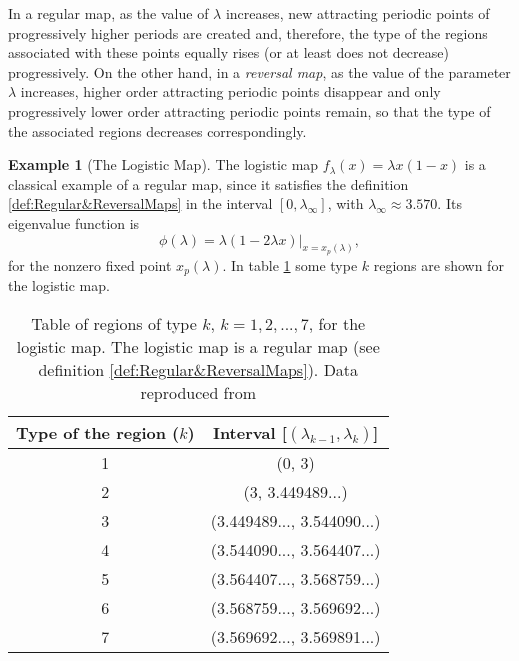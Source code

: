 \documentclass[10pt,twoside,titlepage]{book}
\numberwithin{equation}{chapter}
\numberwithin{figure}{chapter}
\numberwithin{table}{chapter}
\theoremstyle{plain}%
\theoremstyle{definition}
\newtheorem{example}{Example}[chapter]
\theoremstyle{remark}
\begin{document}
In a regular map, as the value of $\lambda$ increases, new attracting periodic points of progressively higher periods are created and, therefore, the type of the regions associated with these points equally rises (or at least does not decrease) progressively. On the other hand, in a \emph{reversal map}, as the value of the parameter $\lambda$ increases, higher order attracting periodic points disappear and only progressively lower order attracting periodic points remain, so that the type of the associated regions decreases correspondingly.

\begin{example}[The Logistic Map]
	\label{ex:logistic}
	The logistic map $f_{\lambda}(x)=\lambda x(1-x)$ is a classical example of a regular map, since it satisfies the definition \ref{def:Regular&ReversalMaps} in the interval $[0,\lambda_{\infty}]$, with $\lambda_{\infty}\approx3.570$. Its eigenvalue function is
	\[\phi(\lambda)=\left.\lambda(1-2\lambda x)\right|_{x=x_{p}(\lambda)},\]
	for the nonzero fixed point $x_p(\lambda)$. In table \ref{tab:BifurcationsLogistic} some type $k$ regions are shown for the logistic map.
	
	\begin{table}
		\begin{tabular}{|c|c|}
			\hline
			\textbf{Type of the region ($k$)}  & \textbf{Interval {[}$(\lambda_{k-1},\lambda_{k})${]}} \tabularnewline
			\hline
			1  & (0, 3) \tabularnewline
			\hline
			2  & (3, 3.449489...) \tabularnewline
			\hline
			3  & (3.449489..., 3.544090...) \tabularnewline
			\hline
			4  & (3.544090..., 3.564407...) \tabularnewline
			\hline
			5  & (3.564407..., 3.568759...) \tabularnewline
			\hline
			6  & (3.568759..., 3.569692...) \tabularnewline
			\hline
			7  & (3.569692..., 3.569891...) \tabularnewline
			\hline
		\end{tabular}
		\caption{Table of regions of type $k$, $k=1,2,...,7$, for the logistic map. The logistic map is a regular map (see definition \ref{def:Regular&ReversalMaps}).
			Data reproduced from \cite[Table 1.1, p.41]{Elaydi}}
		\label{tab:BifurcationsLogistic}
	\end{table}
\end{example}
\end{document}
